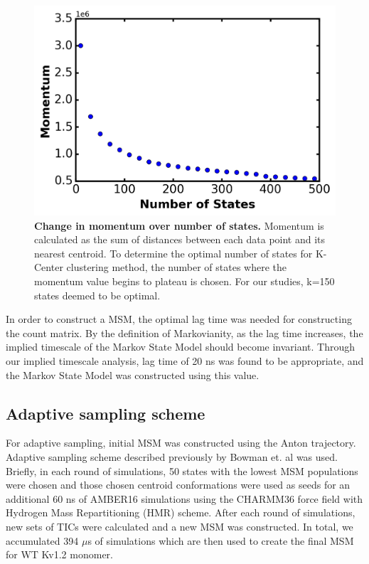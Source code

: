 \begin{figure}[!ht]
\begin{center}
	\includegraphics[width=\textwidth]{figures/chapter2/Fig2-2_momentum.png}
\end{center}
	\caption{\textbf{Change in momentum over number of states.} Momentum is calculated as the sum of distances between each data point and its nearest centroid. To determine the optimal number of states for K-Center clustering method, the number of states where the momentum value begins to plateau is chosen. For our studies, k=150 states deemed to be optimal.}
	\label{fig:ch2_f2}
\end{figure}

In order to construct a MSM, the optimal lag time was needed for constructing the count matrix. By the definition of Markovianity, as the lag time increases, the implied timescale of the Markov State Model should become invariant. Through our implied timescale analysis, lag time of 20 ns was found to be appropriate, and the Markov State Model was constructed using this value.
	
\subsection{Adaptive sampling scheme}
For adaptive sampling, initial MSM was constructed using the Anton trajectory. Adaptive sampling scheme described previously by Bowman et. al was used. \citep{bowman2010} Briefly, in each round of simulations, 50 states with the lowest MSM populations were chosen and those chosen centroid conformations were used as seeds for an additional 60 ns of AMBER16 simulations using the CHARMM36 force field with Hydrogen Mass Repartitioning (HMR) scheme. After each round of simulations, new sets of TICs were calculated and a new MSM was constructed. In total, we accumulated 394 $\mu$s of simulations which are then used to create the final MSM for WT Kv1.2 monomer. 


